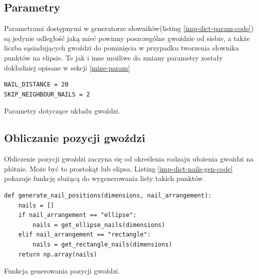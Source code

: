        \subsection{Parametry} \label{imp-dict-param}
        Parametrami dostępnymi w generatorze słowników(listing \ref{imp-dict-param-code}) są jedynie odległość jaką mieć powinny poszczególne gwoździe od siebie, a także liczba sąsiadujących gwoździ do pominięcia w przypadku tworzenia słownika punktów na elipsie. Te jak i inne możliwe do zmiany parametry zostały dokładniej opisane w sekcji \ref{mine-param}
        \begin{code}[H]
        \begin{verbatim}
NAIL_DISTANCE = 20
SKIP_NEIGHBOUR_NAILS = 2
        \end{verbatim}
        \caption{Parametry dotyczące układu gwoździ.}
        \label{imp-dict-param-code}
        \end{code}
        
        \subsection{Obliczanie pozycji gwoździ} \label{imp-dict-nails}
        Obliczenie pozycji gwoździ zaczyna się od określenia rodzaju ułożenia gwoździ na płótnie. Może być to prostokąt lub elipsa. Listing \ref{imp-dict-nails-gen-code} pokazuje funkcję służącą do wygenerowania listy takich punktów.
        \begin{code}[H]
        \begin{verbatim}
def generate_nail_positions(dimensions, nail_arrangement):
    nails = []
    if nail_arrangement == "ellipse":
        nails = get_ellipse_nails(dimensions)
    elif nail_arrangement == "rectangle":
        nails = get_rectangle_nails(dimensions)
    return np.array(nails)
        \end{verbatim}
        \caption{Funkcja generowania pozycji gwoździ.}
        \label{imp-dict-nails-gen-code}
        \end{code}
        
